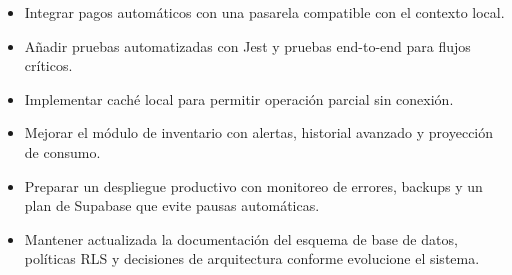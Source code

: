 \begin{itemize}[leftmargin=1.5em]
  \item Integrar pagos automáticos con una pasarela compatible con el contexto local.
  \item Añadir pruebas automatizadas con Jest y pruebas end-to-end para flujos críticos.
  \item Implementar caché local para permitir operación parcial sin conexión.
  \item Mejorar el módulo de inventario con alertas, historial avanzado y proyección
        de consumo.
  \item Preparar un despliegue productivo con monitoreo de errores, backups y un plan
        de Supabase que evite pausas automáticas.
  \item Mantener actualizada la documentación del esquema de base de datos, políticas
        RLS y decisiones de arquitectura conforme evolucione el sistema.
\end{itemize}
